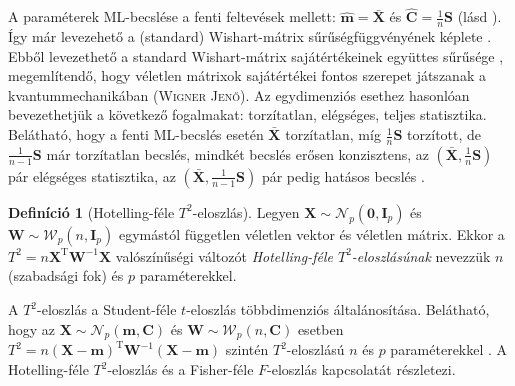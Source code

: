 \documentclass[DIV=15,appendixprefix]{scrreprt}
\theoremstyle{definition}
\newtheorem*{defin}{Definíció}
\theoremstyle{remark}
\newcommand{\normald}{\mathcal{N}}
\newcommand{\wishartd}{\mathcal{W}}
\DeclareMathOperator{\T}{T}
\begin{document}
A paraméterek ML-becslése a fenti feltevések mellett: $ \hat{ \mathbf{ m } } =
\bar{ \mathbf{ X } } $ és $ \hat{ \mathbf{ C } } = \frac{ 1 }{ n } \mathbf{ S } $ (lásd
\cite[5.~fejezet, 5.~szakasz, 5.1.~tétel]{BollaKramli}). Így már levezehető a (standard)
Wishart-mátrix sűrűségfüggvényének képlete \cite[5.~fejezet, 5.~szakasz, 5.2. és
5.3.~tétel]{BollaKramli}. Ebből levezethető a standard Wishart-mátrix sajátértékeinek együttes
sűrűsége \cite[5.~fejezet, 5.~szakasz, 5.4.~tétel]{BollaKramli}, megemlítendő, hogy véletlen
mátrixok sajátértékei fontos szerepet játszanak a kvantummechanikában (\textsc{Wigner Jenő}).
%
Az egydimenziós esethez hasonlóan bevezethetjük a következő fogalmakat: torzítatlan, elégséges,
teljes statisztika. Belátható, hogy a fenti ML-becslés esetén $ \bar{ \mathbf{ X } } $ torzítatlan,
míg $ \frac{ 1 }{ n } \mathbf{ S } $ torzított, de $ \frac{ 1 }{ n - 1 } \mathbf{ S } $ már
torzítatlan becslés, mindkét becslés erősen konzisztens, az $ \left(  \bar{ \mathbf{ X } },{}
\frac{ 1 }{ n } \mathbf{ S } \right) $ pár elégséges statisztika, az $ \left(
\bar{ \mathbf{ X } },{} \frac{ 1 }{ n - 1 } \mathbf{ S } \right) $ pár pedig hatásos becslés
\cite[5. fejezet, 6. szakasz eleje]{BollaKramli}.
\begin{defin}[Hotelling-féle $ T^{ 2 } $-eloszlás]
	Legyen $ \mathbf{ X } \sim \normald_{ p } \left( \mathbf{ 0 },{} \mathbf{ I }_{ p } \right) $ és
	$ \mathbf{ W } \sim \wishartd_{ p } \left( n,{} \mathbf{ I }_{ p } \right) $ egymástól független
	véletlen vektor és véletlen mátrix. Ekkor a $ T^{ 2 } = n \mathbf{ X }^{ \T }
	\mathbf{ W }^{ - 1 } \mathbf{ X } $ valószínűségi változót \emph{Hotelling-féle
	$ T^{ 2 }$-eloszlásúnak} nevezzük $ n $ (szabadsági fok) és $ p $ paraméterekkel.
\end{defin}
A $ T^{ 2 } $-eloszlás a Student-féle $ t $-eloszlás többdimenziós általánosítása. Belátható, hogy
az $ \mathbf{ X } \sim \normald_{ p } \left( \mathbf{ m },{} \mathbf{ C } \right) $ és
$ \mathbf{ W } \sim \wishartd_{ p } \left( n,{} \mathbf{ C } \right) $ esetben $ T^{ 2 } = n \left(
\mathbf{ X } - \mathbf{ m } \right)^{ \T } \mathbf{ W }^{ - 1 } \left( \mathbf{ X } - \mathbf{ m }
\right) $ szintén $ T^{ 2 } $-eloszlású $ n $ és $ p $ paraméterekkel \cite[5.~fejezet, 6.~szakasz,
6.1.~állítás]{BollaKramli}. A Hotelling-féle $ T^{ 2 } $-eloszlás és a Fisher-féle $ F $-eloszlás
kapcsolatát \cite[5.~fejezet, 6.~szakasz, 6.2.~tétel]{BollaKramli} részletezi.
\end{document}
